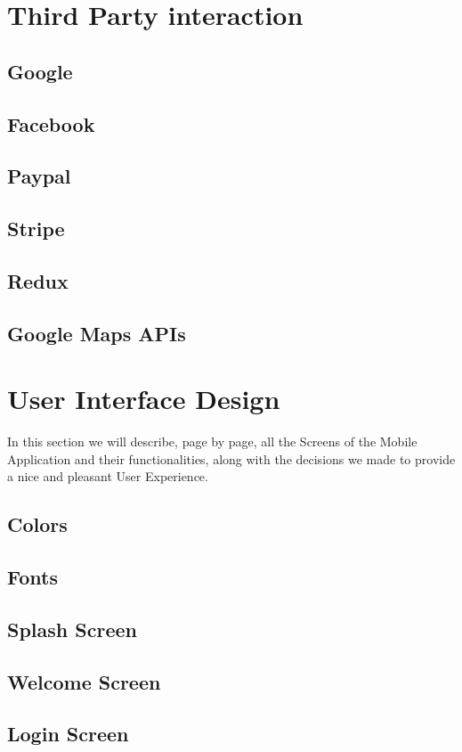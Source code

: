 \documentclass[11pt]{article} %
\begin{document}
\section{Third Party interaction}
\subsection{Google}
\subsection{Facebook}
\subsection{Paypal}
\subsection{Stripe}
\subsection{Redux}
\subsection{Google Maps APIs}


\section{User Interface Design}
In this section we will describe, page by page, all the Screens of the Mobile Application and their functionalities, along with the decisions we made to provide a nice and pleasant User Experience.
\subsection{Colors}
\subsection{Fonts}

\subsection{Splash Screen}
\subsection{Welcome Screen}
\subsection{Login Screen}
\end{document}
